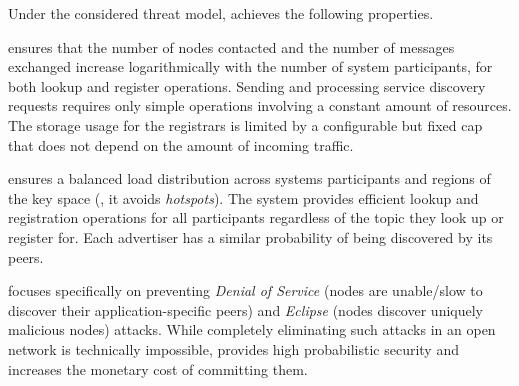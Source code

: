 Under the considered threat model, \sysname achieves the following properties.

\sysname ensures that the number of nodes contacted and the number of messages exchanged increase logarithmically with the number of system participants, for both lookup and register operations. 
Sending and processing service discovery requests requires only simple operations involving a constant amount of resources.
The storage usage for the registrars is limited by a configurable but fixed cap that does not depend on the amount of incoming traffic. 

\sysname ensures a balanced load distribution across systems participants and regions of the key space (\ie, it avoids \emph{hotspots}).
The system provides efficient lookup and registration operations for all participants regardless of the topic they look up or register for.
Each advertiser has a similar probability of being discovered by its peers. 

\sysname focuses specifically on preventing \emph{Denial of Service} (nodes are unable/slow to discover their application-specific peers) and \emph{Eclipse} (nodes discover uniquely malicious nodes) attacks.
While completely eliminating such attacks in an open network is technically impossible, \sysname provides high probabilistic security 
and increases the monetary cost of committing them. 
